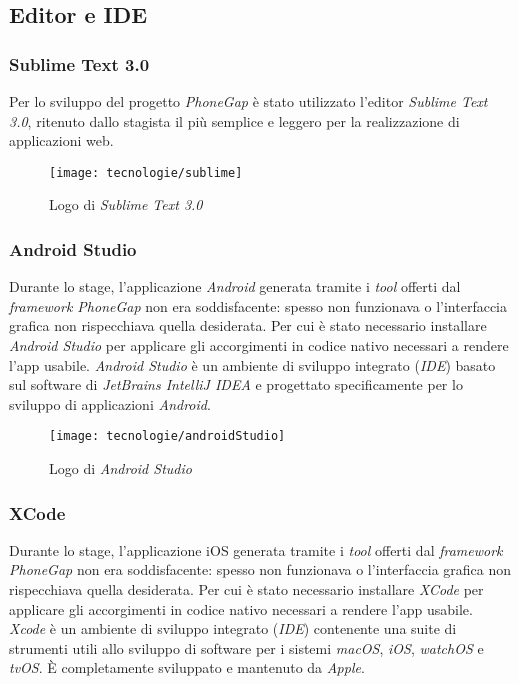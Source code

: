 \subsection{Editor e IDE}

\subsubsection{Sublime Text 3.0}

Per lo sviluppo del progetto \textit{PhoneGap} è stato utilizzato l'editor \textit{Sublime Text 3.0}, ritenuto dallo stagista il più semplice e leggero per la realizzazione di applicazioni web. 

\begin{figure}[!h] 
    \centering 
    \texttt{[image: tecnologie/sublime]} 
    \caption{Logo di \textit{Sublime Text 3.0}}
\end{figure}

\subsubsection{Android Studio}

Durante lo stage, l'applicazione \textit{Android} generata tramite i \textit{tool} offerti dal \textit{framework PhoneGap} non era soddisfacente: spesso non funzionava o l'interfaccia grafica non rispecchiava quella desiderata. Per cui è stato necessario installare \textit{Android Studio} per applicare gli accorgimenti in codice nativo necessari a rendere l'app usabile. \textit{Android Studio} è un ambiente di sviluppo integrato (\textit{IDE}) basato sul software di \textit{JetBrains IntelliJ IDEA} e progettato specificamente per lo sviluppo di applicazioni \textit{Android}.

\begin{figure}[!h] 
    \centering 
    \texttt{[image: tecnologie/androidStudio]} 
    \caption{Logo di \textit{Android Studio}}
\end{figure}

\subsubsection{XCode}

Durante lo stage, l'applicazione iOS generata tramite i \textit{tool} offerti dal \textit{framework PhoneGap} non era soddisfacente: spesso non funzionava o l'interfaccia grafica non rispecchiava quella desiderata. Per cui è stato necessario installare \textit{XCode} per applicare gli accorgimenti in codice nativo necessari a rendere l'app usabile. \textit{Xcode} è un ambiente di sviluppo integrato (\textit{IDE}) contenente una suite di strumenti utili allo sviluppo di software per i sistemi \textit{macOS}, \textit{iOS}, \textit{watchOS} e \textit{tvOS}. È completamente sviluppato e mantenuto da \textit{Apple}.

